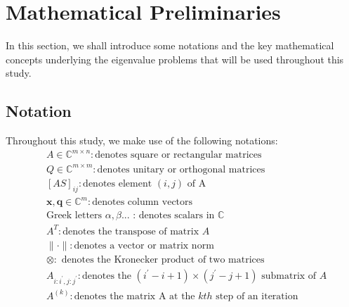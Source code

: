 \section{Mathematical Preliminaries}
In this section, we shall introduce some notations and the key mathematical concepts underlying the eigenvalue problems that will be used throughout this study.
\subsection{Notation}
Throughout this study, we make use of the following notations:
\begin{align*}\nonumber
	&A \in \mathbb{C}^{m\times n}: \text{denotes square or rectangular matrices}\\
	&Q \in \mathbb{C}^{m\times m}: \text{denotes unitary or orthogonal matrices}\\
	&[AS]_{ij}: \text{denotes element $(i, j)$ of A}\\
	&\mathbf{x}, \mathbf{q} \in \mathbb{C}^{m}: \text{denotes column vectors}\\
	&\text{Greek letters }\alpha, \beta\text{...} \text{ : denotes scalars in $\mathbb{C}$}\\
	&A^{T}: \text{denotes the transpose of matrix $A$}\\
	&\| \cdot \|: \text{denotes a vector or matrix norm }\\
	& \otimes: \text{ denotes the Kronecker product of two matrices}\\
	&A_{i:i^\prime, j:j^\prime}: \text{denotes the $(i^\prime - i + 1) \times (j^\prime - j + 1)$ submatrix of $A$}\\
	&A^{(k)}: \text{denotes the matrix A at the $kth$ step of an iteration}
\end{align*}
